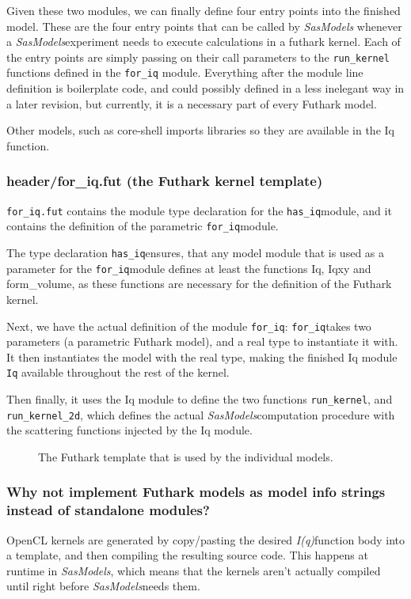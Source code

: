 \documentclass[11pt]{article}
\newcommand{\sasmodels}{\textit{SasModels}}
\newcommand{\iq}{\textit{I(q)}}
\newcommand{\foriq}{\texttt{for\_iq}}
\newcommand{\hasiq}{\texttt{has\_iq}}
\begin{document}
Given these two modules, we can finally define four entry points into the
finished model. These are the four entry points that can be called by \sasmodels
whenever a \sasmodels experiment needs to execute calculations in a futhark
kernel.
Each of the entry points are simply passing on their call parameters to the 
\texttt{run\_kernel} functions defined in the \texttt{for\_iq} module.
Everything after the module line definition is boilerplate code, and could
possibly defined in a less inelegant way in a later revision, but currently, it 
is a necessary part of every Futhark model.

Other models, such as core-shell %
imports libraries so they are available in the Iq function.

\subsubsection{header/for\_iq.fut (the Futhark kernel template)}
\texttt{for\_iq.fut} contains the module type declaration for the \hasiq module,
 and it contains the definition of the parametric \foriq module. 

The type declaration \hasiq ensures, that any model module that is
used as a parameter for the \foriq module defines at least the functions
Iq, Iqxy and form\_volume, as these functions are necessary for the definition
of the Futhark kernel.

Next, we have the actual definition of the module \foriq:
\foriq takes two parameters (a parametric Futhark model), and a real type 
to instantiate it with.
It then instantiates the model with the real type, making the finished Iq module
\texttt{Iq} available throughout the rest of the kernel.

Then finally, it uses the Iq module to define the two functions 
\texttt{run\_kernel}, and \texttt{run\_kernel\_2d}, which defines the actual 
\sasmodels computation procedure with the scattering functions injected by 
the Iq module.

\begin{figure}
  
  \caption{The Futhark template that is used by the individual models.}
  \label{fig:for-iq}
\end{figure}

\subsubsection{Why not implement Futhark models as model info strings 
instead of standalone modules?}
OpenCL kernels are generated by copy/pasting the desired \iq function body
into a template, and then compiling the resulting source code.
This happens at runtime in \sasmodels, which means that the kernels aren't
 actually compiled until right before \sasmodels needs them.
\end{document}
